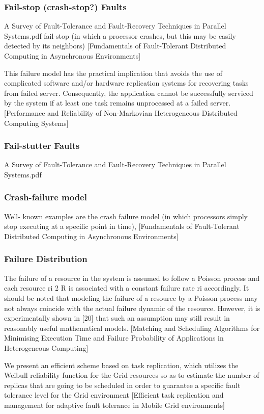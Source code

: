 \documentclass{cslthse-msc}
\begin{document}
\subsubsection*{Fail-stop (crash-stop?) Faults}
A Survey of Fault-Tolerance and Fault-Recovery Techniques in Parallel Systems.pdf
fail-stop (in which a processor crashes, but this may be easily detected by its neighbors) [Fundamentals of Fault-Tolerant Distributed Computing in Asynchronous Environments]

This failure model has the practical implication that avoids the use of complicated software and/or hardware replication systems for recovering tasks from failed server. Consequently, the application cannot be successfully serviced by the system if at least one task remains unprocessed at a failed server. [Performance and Reliability of Non-Markovian Heterogeneous Distributed Computing Systems]

\subsubsection*{Fail-stutter Faults}
A Survey of Fault-Tolerance and Fault-Recovery Techniques in Parallel Systems.pdf
\subsubsection{Crash-failure model}
Well- known examples are the crash failure model (in which processors simply stop executing at a specific point in time), [Fundamentals of Fault-Tolerant Distributed Computing in Asynchronous Environments]

\subsubsection{Failure Distribution}
The failure of a resource in the system is assumed to follow a Poisson process and each resource ri 2 R is associated with a constant failure rate  ri accordingly. It should be noted that modeling the failure of a resource by a Poisson process may not always coincide with the actual failure dynamic of the resource. However, it is experimentally shown in [20] that such an assumption may still result in reasonably useful mathematical models. [Matching and Scheduling Algorithms for Minimising Execution Time and Failure Probability of Applications in Heterogeneous Computing]


We present an efficient scheme based on task replication, which utilizes the Weibull reliability function for the Grid resources so as to estimate the number of replicas that are going to be scheduled in order to guarantee a specific fault tolerance level for the Grid environment [Efficient task replication and management for adaptive fault tolerance in Mobile Grid environments]
\end{document}
